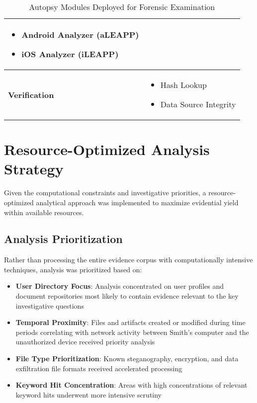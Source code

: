 \begin{table}[htbp]
\begin{tabular}{|p{5cm}|p{10cm}|}
\begin{itemize}
    \item Android Analyzer (aLEAPP)
    \item iOS Analyzer (iLEAPP)
\end{itemize} \\
\hline
\textbf{Verification} & 
\begin{itemize}
    \item Hash Lookup
    \item Data Source Integrity
\end{itemize} \\
\hline
\end{tabular}
\caption{Autopsy Modules Deployed for Forensic Examination}
\label{tab:autopsy_modules}
\end{table}

\section{Resource-Optimized Analysis Strategy}
Given the computational constraints and investigative priorities, a resource-optimized analytical approach was implemented to maximize evidential yield within available resources.

\subsection{Analysis Prioritization}
Rather than processing the entire evidence corpus with computationally intensive techniques, analysis was prioritized based on:

\begin{itemize}
    \item \textbf{User Directory Focus}: Analysis concentrated on user profiles and document repositories most likely to contain evidence relevant to the key investigative questions
    
    \item \textbf{Temporal Proximity}: Files and artifacts created or modified during time periods correlating with network activity between Smith's computer and the unauthorized device received priority analysis
    
    \item \textbf{File Type Prioritization}: Known steganography, encryption, and data exfiltration file formats received accelerated processing
    
    \item \textbf{Keyword Hit Concentration}: Areas with high concentrations of relevant keyword hits underwent more intensive scrutiny
\end{itemize}

